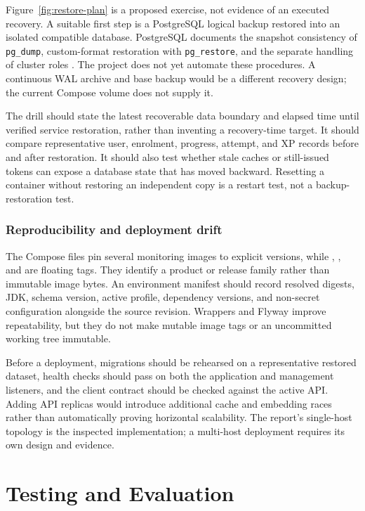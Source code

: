 \documentclass[12pt,a4paper,oneside]{report}
\begin{document}
\restoreplandiagram

Figure~\ref{fig:restore-plan} is a proposed exercise, not evidence of an executed
recovery. A suitable first step is a PostgreSQL logical backup restored into an
isolated compatible database. PostgreSQL documents the snapshot consistency of
\texttt{pg\_dump}, custom-format restoration with \texttt{pg\_restore}, and the
separate handling of cluster roles \cite{postgresbackup}. The project does not yet
automate these procedures. A continuous WAL archive and base backup would be a
different recovery design; the current Compose volume does not supply it.

The drill should state the latest recoverable data boundary and elapsed time until
verified service restoration, rather than inventing a recovery-time target. It should
compare representative user, enrolment, progress, attempt, and XP records before and
after restoration. It should also test whether stale caches or still-issued tokens
can expose a database state that has moved backward. Resetting a container without
restoring an independent copy is a restart test, not a backup-restoration test.

\subsection{Reproducibility and deployment drift}
The Compose files pin several monitoring images to explicit versions, while
, , and
 are floating tags. They identify a product or
release family rather than immutable image bytes. An environment manifest should
record resolved digests, JDK, schema version, active profile, dependency versions,
and non-secret configuration alongside the source revision. Wrappers and Flyway
improve repeatability, but they do not make mutable image tags or an uncommitted
working tree immutable.

Before a deployment, migrations should be rehearsed on a representative restored
dataset, health checks should pass on both the application and management listeners,
and the client contract should be checked against the active API. Adding API replicas
would introduce additional cache and embedding races rather than automatically
proving horizontal scalability. The report's single-host topology is the inspected
implementation; a multi-host deployment requires its own design and evidence.

\chapter{Testing and Evaluation}
\end{document}
